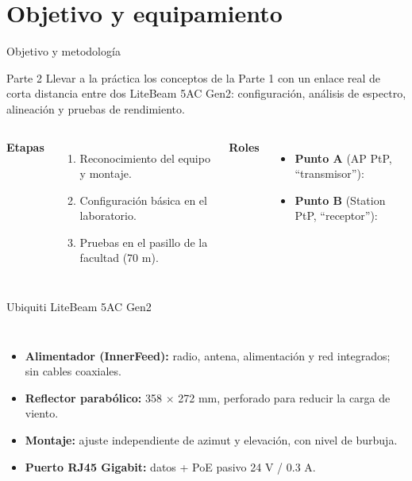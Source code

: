 \renewcommand{\seccorta}{Equipamiento}
\section{Objetivo y equipamiento}

\begin{frame}{Objetivo y metodología}
  \begin{block}{Parte 2}
    Llevar a la práctica los conceptos de la Parte 1 con un enlace real de corta distancia
    entre dos LiteBeam 5AC Gen2: configuración, análisis de espectro, alineación y pruebas de
    rendimiento.
  \end{block}
  \vspace{4pt}
  \begin{columns}[T]
    \textbf{Etapas}
    \begin{enumerate}
      \item Reconocimiento del equipo y montaje.
      \item Configuración básica en el laboratorio.
      \item Pruebas en el pasillo de la facultad (70 m).
    \end{enumerate}
    \textbf{Roles}
    \begin{itemize}
      \item \textbf{Punto A} (AP PtP, ``transmisor''): \grupoAP
      \item \textbf{Punto B} (Station PtP, ``receptor''): \grupoST
    \end{itemize}
  \end{columns}
\end{frame}

\begin{frame}{Ubiquiti LiteBeam 5AC Gen2}
  \begin{columns}[c]
    \centering
    \small
    \begin{itemize}
      \item \textbf{Alimentador (InnerFeed):} radio, antena, alimentación y red integrados; sin cables coaxiales.
      \item \textbf{Reflector parabólico:} 358 $\times$ 272 mm, perforado para reducir la carga de viento.
      \item \textbf{Montaje:} ajuste independiente de azimut y elevación, con nivel de burbuja.
      \item \textbf{Puerto RJ45 Gigabit:} datos + PoE pasivo 24 V / 0.3 A.
    \end{itemize}
  \end{columns}
\end{frame}

